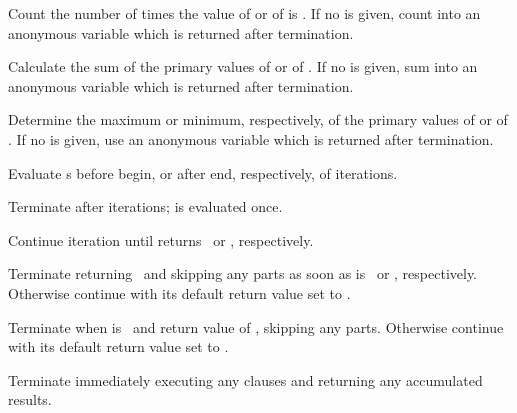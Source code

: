\begin{LIST}{1cm}
\begin{LIST}{.5cm}
    {
      Count the number of times the value of  or of  is \T.
      If no  is given, count into an anonymous variable
      which is returned after termination.
    }

    {
      Calculate the sum of the primary values of  or of .
      If no  is given, sum into an anonymous variable
      which is returned after termination.
    }

    {
      Determine the maximum or minimum, respectively, of the primary values of
       or of .
      If no  is given, use an anonymous variable
      which is returned after termination.
    }

    {
      Evaluate s before begin, or after end, respectively,
      of iterations.
    }

    {
      Terminate  after  iterations;  is
      evaluated once.
    }

    {
      Continue iteration until  returns \NIL\ or \T,
      respectively.
    }

    {
      Terminate  returning \NIL\ and skipping any
       parts as soon as  is \NIL\ or \T,
      respectively. Otherwise continue  with its default
      return value set to \T.
    }

    {
      Terminate  when  is \T\ and return value of
      , skipping any  parts. Otherwise
      continue  with its default return value set to \NIL.
    }

    {
      Terminate  immediately executing any 
      clauses and returning any accumulated results.
    }
  \end{LIST}
\end{LIST}





